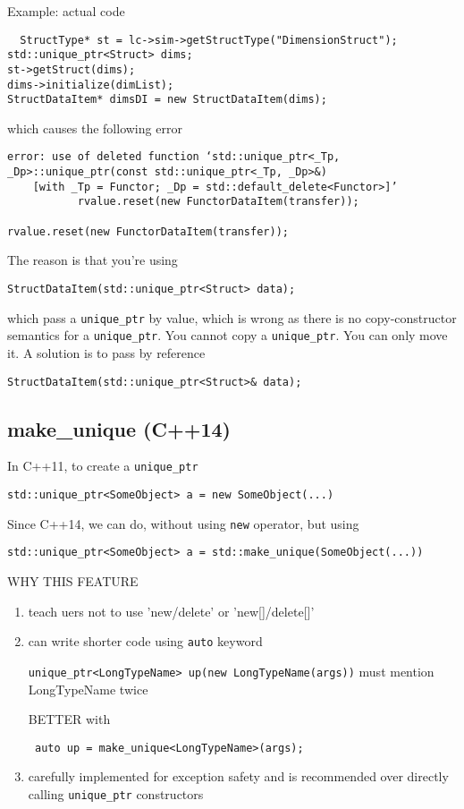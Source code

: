 Example: actual code
\begin{verbatim}
  StructType* st = lc->sim->getStructType("DimensionStruct");
std::unique_ptr<Struct> dims;
st->getStruct(dims);
dims->initialize(dimList);
StructDataItem* dimsDI = new StructDataItem(dims);

\end{verbatim}
which causes the following error
\begin{verbatim}
error: use of deleted function ‘std::unique_ptr<_Tp, _Dp>::unique_ptr(const std::unique_ptr<_Tp, _Dp>&) 
    [with _Tp = Functor; _Dp = std::default_delete<Functor>]’
           rvalue.reset(new FunctorDataItem(transfer));
           
rvalue.reset(new FunctorDataItem(transfer));

\end{verbatim}

The reason is that you're using
\begin{verbatim}
StructDataItem(std::unique_ptr<Struct> data);
\end{verbatim}
which pass a \verb!unique_ptr! by value, which is wrong as there is no copy-constructor semantics for a \verb!unique_ptr!.
You cannot copy a \verb!unique_ptr!. You can only move it.
A solution is to pass by reference
\begin{verbatim}
StructDataItem(std::unique_ptr<Struct>& data);
\end{verbatim}


\subsection{make\_unique (C++14)}
\label{sec:make_unique}

In C++11, to create a \verb!unique_ptr!
\begin{verbatim}
std::unique_ptr<SomeObject> a = new SomeObject(...)
\end{verbatim}

Since C++14, we can do, without using \verb!new! operator, but using
\begin{verbatim}
std::unique_ptr<SomeObject> a = std::make_unique(SomeObject(...))
\end{verbatim}

WHY THIS FEATURE
\begin{enumerate}
  \item teach uers not to use 'new/delete' or 'new[]/delete[]'
  
  \item can write shorter code using \verb!auto! keyword
  
   \verb!unique_ptr<LongTypeName> up(new LongTypeName(args))! must mention LongTypeName twice
 
 BETTER with
 \begin{verbatim}
 auto up = make_unique<LongTypeName>(args);
 \end{verbatim}
  
  \item carefully implemented for exception safety and is recommended over directly calling \verb!unique_ptr! constructors
\end{enumerate}

